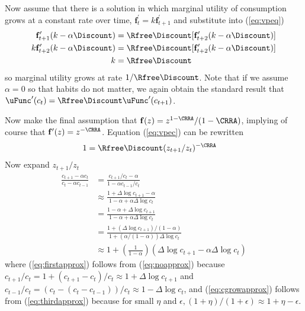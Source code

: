 Now assume that there is a solution in which marginal utility of
consumption grows at a constant rate over time, $\mathbf{f}_{t}^{\prime}=k
\mathbf{f}_{t+1}^{\prime}$ and substitute into (\ref{eq:vpeq})
\begin{equation}\begin{gathered}\begin{aligned}
        \mathbf{f}_{t+1}^{\prime}(k-\alpha \Discount) & =  \Rfree\Discount[\mathbf{f}_{t+2}^{\prime}(k-\alpha \Discount)] \label{eq:vpec}
\\      k \mathbf{f}_{t+2}^{\prime}(k-\alpha \Discount) & =  \Rfree\Discount[\mathbf{f}_{t+2}^{\prime}(k-\alpha \Discount)]
\\  k & =  \Rfree\Discount
\end{aligned}\end{gathered}\end{equation}
so marginal utility grows at rate $1/\Rfree\Discount$.  Note
that if we assume $\alpha=0$ so that habits do not matter, we again obtain
the standard result that $\uFunc^{\prime}(c_{t}) = \Rfree\Discount \uFunc^{\prime}(c_{t+1})$.

Now make the final assumption that $\mathbf{f}(z) = z^{1-\CRRA}/(1-\CRRA)$, implying
of course that $\mathbf{f}^{\prime}(z) = z^{-\CRRA}$.  Equation (\ref{eq:vpec}) can be rewritten
\begin{equation}\begin{gathered}\begin{aligned}
        1 & =  \Rfree\Discount (z_{t+1}/z_{t})^{-\CRRA} \label{eq:zfoc}
\end{aligned}\end{gathered}\end{equation}
Now expand $z_{t+1}/z_{t}$
\begin{align}
   \frac{c_{t+1}-\alpha c_{t}}{c_{t}-\alpha c_{t-1}} & =  \frac{c_{t+1}/c_{t}-\alpha}{1-\alpha c_{t-1}/c_{t}} \label{eq:noapprox}
\\ & \approx  \frac{1+\Delta \log c_{t+1}-\alpha}{1 - \alpha + \alpha \Delta \log c_{t}} \label{eq:firstapprox}
\\ & =  \frac{1-\alpha+\Delta \log c_{t+1}}{1 - \alpha + \alpha \Delta \log c_{t}} \label{eq:secondapprox}
\\ & =  \frac{1+(\Delta \log c_{t+1})/(1-\alpha)}{1 + (\alpha/(1-\alpha)) \Delta \log c_{t}} \label{eq:thirdapprox}
\\ & \approx  1+\left(\frac{1}{1-\alpha}\right)\left(\Delta \log c_{t+1} - \alpha \Delta \log c_{t} \label{eq:cgrowapprox} \right)
\end{align}
where (\ref{eq:firstapprox}) follows from (\ref{eq:noapprox}) because
$c_{t+1}/c_{t} = 1+(c_{t+1}-c_{t})/c_{t} \approx 1+\Delta \log
c_{t+1}$ and $c_{t-1}/c_{t} = (c_{t}-(c_{t}-c_{t-1}))/c_{t} \approx 1
- \Delta \log c_{t}$, and (\ref{eq:cgrowapprox}) follows from
(\ref{eq:thirdapprox}) because for small $\eta$ and $\epsilon, (1+\eta)/(1+\epsilon)
\approx 1+\eta-\epsilon$.

